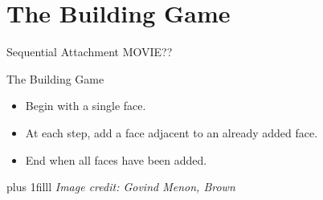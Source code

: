 \documentclass{beamer}
\newcommand{\btVFill}{\vskip0pt plus 1filll}
\begin{document}
\section{The Building Game}
\begin{frame}{Sequential Attachment}
MOVIE??
\end{frame}
\begin{frame}{The Building Game}
%
\begin{itemize}
  \item Begin with a single face.
  \item At each step, add a face adjacent to an already added face.
  \item End when all faces have been added.
\end{itemize}
\btVFill
\textit{\scriptsize Image credit: Govind Menon, Brown} 

\end{frame}
\end{document}
